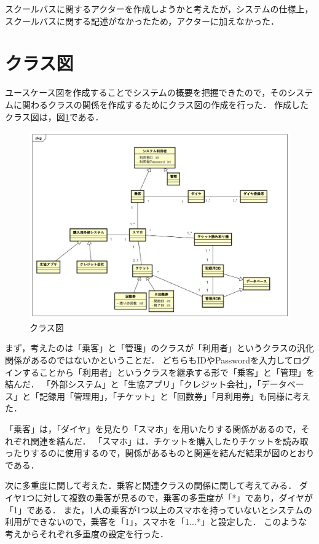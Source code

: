\documentclass[documentclass]{jsarticle}
\begin{document}
スクールバスに関するアクターを作成しようかと考えたが，システムの仕様上，スクールバスに関する記述がなかったため，アクターに加えなかった．
\newpage

\section{クラス図}

ユースケース図を作成することでシステムの概要を把握できたので，そのシステムに関わるクラスの関係を作成するためにクラス図の作成を行った．
作成したクラス図は，図\ref*{fig:2-1}である．

\begin{figure}[H]
  \begin{center}
    \includegraphics*[scale=0.5]{figure/2-1.png}
  \end{center}
  \caption{クラス図}
  \label{fig:2-1}
\end{figure}

まず，考えたのは「乗客」と「管理」のクラスが「利用者」というクラスの汎化関係があるのではないかということだ．
どちらもIDやPasswordを入力してログインすることから「利用者」というクラスを継承する形で「乗客」と「管理」を結んだ．
「外部システム」と「生協アプリ」「クレジット会社」，「データベース」と「記録用「管理用」，「チケット」と「回数券」「月利用券」も同様に考えた．

「乗客」は，「ダイヤ」を見たり「スマホ」を用いたりする関係があるので，それぞれ関連を結んだ．
「スマホ」は．チケットを購入したりチケットを読み取ったりするのに使用するので，関係があるものと関連を結んだ結果が図のとおりである．

次に多重度に関して考えた．乗客と関連クラスの関係に関して考えてみる．
ダイヤ1つに対して複数の乗客が見るので，乗客の多重度が「*」であり，ダイヤが「1」である．
また，1人の乗客が1つ以上のスマホを持っていないとシステムの利用ができないので，乗客を「1」，スマホを「1...*」と設定した．
このような考えからそれぞれ多重度の設定を行った．
\end{document}
